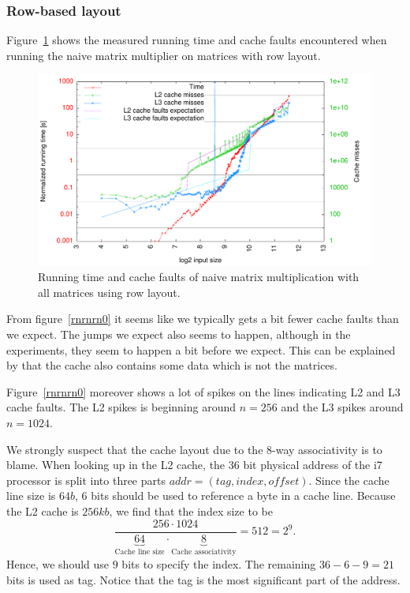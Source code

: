 \subsubsection{Row-based layout}
Figure~\ref{fig:rnrnrn0} shows the measured running time and cache
faults encountered when running the naive matrix multiplier on
matrices with row layout.
\begin{figure}[h!]
  \centering
  \includegraphics[width=\textwidth]{plots/rowrow.pdf}
  \caption{Running time and cache faults of naive matrix
    multiplication with all matrices using row layout.}
  \label{fig:rnrnrn0}
\end{figure}

From figure~\ref{rnrnrn0} it seems like we typically gets a bit fewer
cache faults than we expect. The jumps we expect
also seems to happen, although in the experiments, they seem to happen
a bit before we expect. This can be explained by that the cache also
contains some data which is not the matrices.

Figure~\ref{rnrnrn0} moreover shows a lot of spikes on the lines
indicating L2 and L3 cache faults. The L2 spikes is beginning around
$n = 256$ and the L3 spikes around $n = 1024$.

We strongly suspect that the cache layout due to the 8-way
associativity is to blame. When looking up in the L2 cache, the 36 bit
physical address of the i7 processor is split into three parts $addr =
(tag,index,offset)$. Since the cache line size is $64b$, $6$ bits
should be used to reference a byte in a cache line. Because the L2
cache is $256kb$, we find that the index size to be
\[
  \frac{256 \cdot 1024}{\underbrace{64}_{\text{Cache line size}} \cdot \underbrace{8}_{\text{Cache associativity}}}
    = 512 = 2^9.
\]
Hence, we should use $9$ bits to specify the index. The remaining
$36-6-9=21$ bits is used as tag. Notice that the tag is the most
significant part of the address.

